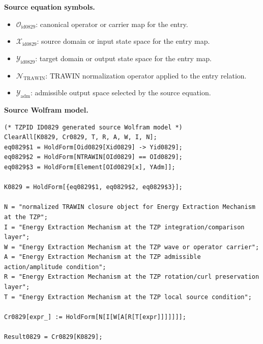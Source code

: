 \begin{minipage}[t]{0.49\linewidth}
\begingroup
\small
\raggedright
\textbf{Source equation symbols.}\par
\begin{itemize}[leftmargin=1.35em,itemsep=1pt,topsep=1pt,parsep=0pt]
    \item $\mathcal{O}_{\mathrm{id0829}}$: canonical operator or carrier map for the entry.
    \item $\mathcal{X}_{\mathrm{id0829}}$: source domain or input state space for the entry map.
    \item $\mathcal{Y}_{\mathrm{id0829}}$: target domain or output state space for the entry map.
    \item $\mathcal{N}_{\mathrm{TRAWIN}}$: TRAWIN normalization operator applied to the entry relation.
    \item $\mathcal{Y}_{\mathrm{adm}}$: admissible output space selected by the source equation.
\end{itemize}
\endgroup
\end{minipage}\hfill
\begin{minipage}[t]{0.47\linewidth}
\begingroup
\scriptsize
\raggedright
\textbf{Source Wolfram model.}\par
\begin{Verbatim}[fontsize=\tiny,breaklines=true,breakanywhere=true]
(* TZPID ID0829 generated source Wolfram model *)
ClearAll[K0829, Cr0829, T, R, A, W, I, N];
eq0829$1 = HoldForm[Oid0829[Xid0829] -> Yid0829];
eq0829$2 = HoldForm[NTRAWIN[OId0829] == OId0829];
eq0829$3 = HoldForm[Element[OId0829[x], YAdm]];

K0829 = HoldForm[{eq0829$1, eq0829$2, eq0829$3}];

N = "normalized TRAWIN closure object for Energy Extraction Mechanism at the TZP";
I = "Energy Extraction Mechanism at the TZP integration/comparison layer";
W = "Energy Extraction Mechanism at the TZP wave or operator carrier";
A = "Energy Extraction Mechanism at the TZP admissible action/amplitude condition";
R = "Energy Extraction Mechanism at the TZP rotation/curl preservation layer";
T = "Energy Extraction Mechanism at the TZP local source condition";

Cr0829[expr_] := HoldForm[N[I[W[A[R[T[expr]]]]]]];

Result0829 = Cr0829[K0829];
\end{Verbatim}
\endgroup
\end{minipage}

